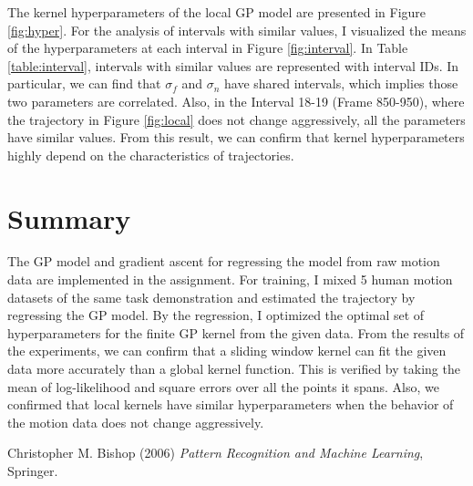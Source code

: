 \documentclass[conference]{IEEEtran}
\begin{document}
The kernel hyperparameters of the local GP model are presented in Figure \ref{fig:hyper}.
For the analysis of intervals with similar values, I visualized the means of the hyperparameters at each interval in Figure \ref{fig:interval}.
In Table \ref{table:interval}, intervals with similar values are represented with interval IDs.
In particular, we can find that $\sigma_f$ and $\sigma_n$ have shared intervals, which implies those two parameters are correlated. 
Also, in the Interval 18-19 (Frame 850-950), where the trajectory in Figure \ref{fig:local} does not change aggressively, all the parameters have similar values.
From this result, we can confirm that kernel hyperparameters highly depend on the characteristics of trajectories.

\section{Summary} %

The GP model and gradient ascent for regressing the model from raw motion data are implemented in the assignment. 
For training, I mixed 5 human motion datasets of the same task demonstration and estimated the trajectory by regressing the GP model.
By the regression, I optimized the optimal set of hyperparameters for the finite GP kernel from the given data.
From the results of the experiments, we can confirm that a sliding window kernel can fit the given data more accurately than a global kernel function.
This is verified by taking the mean of log-likelihood and square errors over all the points it spans.
Also, we confirmed that local kernels have similar hyperparameters when the behavior of the motion data does not change aggressively.



\begin{thebibliography}{9}
Christopher M. Bishop (2006) \emph{Pattern Recognition and Machine Learning}, Springer.
\end{thebibliography}
\end{document}
